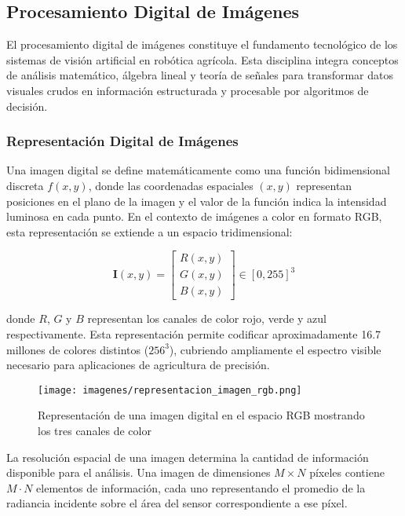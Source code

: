 \subsection{Procesamiento Digital de Imágenes}

El procesamiento digital de imágenes constituye el fundamento tecnológico de los sistemas de visión artificial en robótica agrícola. Esta disciplina integra conceptos de análisis matemático, álgebra lineal y teoría de señales para transformar datos visuales crudos en información estructurada y procesable por algoritmos de decisión.

\subsubsection{Representación Digital de Imágenes}

Una imagen digital se define matemáticamente como una función bidimensional discreta $f(x,y)$, donde las coordenadas espaciales $(x,y)$ representan posiciones en el plano de la imagen y el valor de la función indica la intensidad luminosa en cada punto. En el contexto de imágenes a color en formato RGB, esta representación se extiende a un espacio tridimensional:

\begin{equation}
\mathbf{I}(x,y) = \begin{bmatrix} R(x,y) \\ G(x,y) \\ B(x,y) \end{bmatrix} \in [0, 255]^3
\end{equation}

donde $R$, $G$ y $B$ representan los canales de color rojo, verde y azul respectivamente. Esta representación permite codificar aproximadamente 16.7 millones de colores distintos ($256^3$), cubriendo ampliamente el espectro visible necesario para aplicaciones de agricultura de precisión.

\begin{figure}[h]
\centering
\texttt{[image: imagenes/representacion\_imagen\_rgb.png]}
\caption{Representación de una imagen digital en el espacio RGB mostrando los tres canales de color}
\label{fig:representacion_rgb}
\end{figure}

La resolución espacial de una imagen determina la cantidad de información disponible para el análisis. Una imagen de dimensiones $M \times N$ píxeles contiene $M \cdot N$ elementos de información, cada uno representando el promedio de la radiancia incidente sobre el área del sensor correspondiente a ese píxel.


